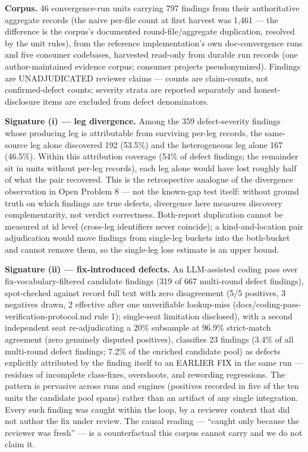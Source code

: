 \documentclass[
  11pt,
]{article}
\begin{document}
\textbf{Corpus.} 46 convergence-run units carrying 797 findings from
their authoritative aggregate records (the naive per-file count at first
harvest was 1,461 --- the difference is the corpus's documented
round-file/aggregate duplication, resolved by the unit rules), from the
reference implementation's own doc-convergence runs and five consumer
codebases, harvested read-only from durable run records (one
author-maintained evidence corpus; consumer projects pseudonymized).
Findings are UNADJUDICATED reviewer claims --- counts are claim-counts,
not confirmed-defect counts; severity strata are reported separately and
honest-disclosure items are excluded from defect denominators.

\textbf{Signature (i) --- leg divergence.} Among the 359 defect-severity
findings whose producing leg is attributable from surviving per-leg
records, the same-source leg alone discovered 192 (53.5\%) and the
heterogeneous leg alone 167 (46.5\%). Within this attribution coverage
(54\% of defect findings; the remainder sit in units without per-leg
records), each leg alone would have lost roughly half of what the pair
recovered. This is the retrospective analogue of the divergence
observation in Open Problem 8 --- not the known-gap test itself: without
ground truth on which findings are true defects, divergence here
measures discovery complementarity, not verdict correctness. Both-report
duplication cannot be measured at id level (cross-leg identifiers never
coincide); a kind-and-location pair adjudication would move findings
from single-leg buckets into the both-bucket and cannot remove them, so
the single-leg loss estimate is an upper bound.

\textbf{Signature (ii) --- fix-introduced defects.} An LLM-assisted
coding pass over fix-vocabulary-filtered candidate findings (319 of 667
multi-round defect findings), spot-checked against record full text with
zero disagreement (5/5 positives, 3 negatives drawn, 2 effective after
one unverifiable lookup-miss (docs/coding-pass-verification-protocol.md
rule 1); single-seat limitation disclosed), with a second independent
seat re-adjudicating a 20\% subsample at 96.9\% strict-match agreement
(zero genuinely disputed positives), classifies 23 findings (3.4\% of
all multi-round defect findings; 7.2\% of the enriched candidate pool)
as defects explicitly attributed by the finding itself to an EARLIER FIX
in the same run --- residues of incomplete class-fixes, overshoots, and
rewording regressions. The pattern is pervasive across runs and engines
(positives recorded in five of the ten units the candidate pool spans)
rather than an artifact of any single integration. Every such finding
was caught within the loop, by a reviewer context that did not author
the fix under review. The causal reading --- ``caught only because the
reviewer was fresh'' --- is a counterfactual this corpus cannot carry
and we do not claim it.
\end{document}
